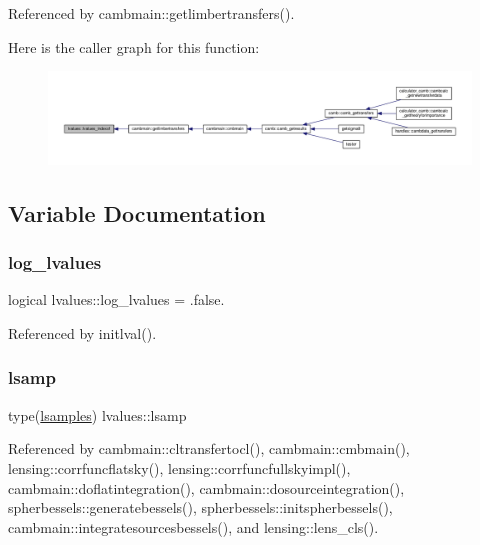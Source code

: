 Referenced by cambmain\+::getlimbertransfers().

Here is the caller graph for this function\+:
\nopagebreak
\begin{figure}[H]
\begin{center}
\leavevmode
\includegraphics[width=350pt]{namespacelvalues_ae29d1934474229125b75e4a609f4e81e_icgraph}
\end{center}
\end{figure}


\subsection{Variable Documentation}
\mbox{\label{namespacelvalues_afe164d781a115f4ab472604a3b522c6d}} 
\subsubsection{\texorpdfstring{log\+\_\+lvalues}{log\_lvalues}}
{\footnotesize\ttfamily logical lvalues\+::log\+\_\+lvalues = .false.}



Referenced by initlval().

\mbox{\label{namespacelvalues_ae00efa8263b3dcff6d82e34d4102a808}} 
\subsubsection{\texorpdfstring{lsamp}{lsamp}}
{\footnotesize\ttfamily type(\mbox{\hyperlink{structlvalues_1_1lsamples}{lsamples}}) lvalues\+::lsamp}



Referenced by cambmain\+::cltransfertocl(), cambmain\+::cmbmain(), lensing\+::corrfuncflatsky(), lensing\+::corrfuncfullskyimpl(), cambmain\+::doflatintegration(), cambmain\+::dosourceintegration(), spherbessels\+::generatebessels(), spherbessels\+::initspherbessels(), cambmain\+::integratesourcesbessels(), and lensing\+::lens\+\_\+cls().

